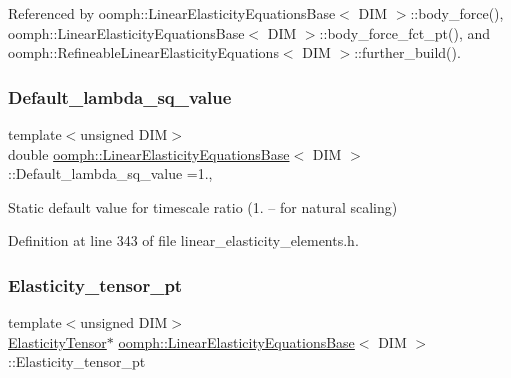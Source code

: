 Referenced by oomph\+::\+Linear\+Elasticity\+Equations\+Base$<$ D\+I\+M $>$\+::body\+\_\+force(), oomph\+::\+Linear\+Elasticity\+Equations\+Base$<$ D\+I\+M $>$\+::body\+\_\+force\+\_\+fct\+\_\+pt(), and oomph\+::\+Refineable\+Linear\+Elasticity\+Equations$<$ D\+I\+M $>$\+::further\+\_\+build().

\mbox{\label{classoomph_1_1LinearElasticityEquationsBase_a1e211e506e98ab5f1b0276d0746f4985}} 
\subsubsection{\texorpdfstring{Default\+\_\+lambda\+\_\+sq\+\_\+value}{Default\_lambda\_sq\_value}}
{\footnotesize\ttfamily template$<$unsigned D\+IM$>$ \\
double \hyperlink{classoomph_1_1LinearElasticityEquationsBase}{oomph\+::\+Linear\+Elasticity\+Equations\+Base}$<$ D\+IM $>$\+::Default\+\_\+lambda\+\_\+sq\+\_\+value =1.\hspace{0.3cm}{\ttfamily [static]}, {\ttfamily [protected]}}



Static default value for timescale ratio (1. -- for natural scaling) 



Definition at line 343 of file linear\+\_\+elasticity\+\_\+elements.\+h.

\mbox{\label{classoomph_1_1LinearElasticityEquationsBase_a0d7307299ede86c07c002a86cf965a70}} 
\subsubsection{\texorpdfstring{Elasticity\+\_\+tensor\+\_\+pt}{Elasticity\_tensor\_pt}}
{\footnotesize\ttfamily template$<$unsigned D\+IM$>$ \\
\hyperlink{classoomph_1_1ElasticityTensor}{Elasticity\+Tensor}$\ast$ \hyperlink{classoomph_1_1LinearElasticityEquationsBase}{oomph\+::\+Linear\+Elasticity\+Equations\+Base}$<$ D\+IM $>$\+::Elasticity\+\_\+tensor\+\_\+pt\hspace{0.3cm}{\ttfamily [protected]}}



